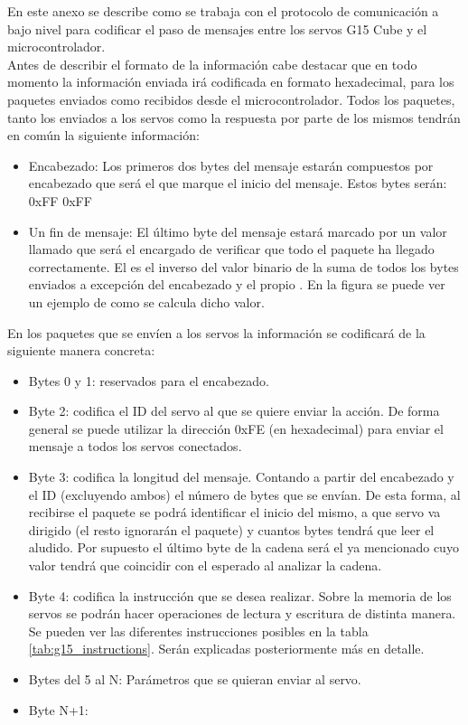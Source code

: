     En este anexo se describe como se trabaja con el protocolo de comunicación a bajo nivel para codificar el paso de mensajes entre los servos G15 Cube y el microcontrolador. 
    \\
    
    Antes de describir el formato de la información cabe destacar que en todo momento la información enviada irá codificada en formato hexadecimal, para los paquetes enviados como recibidos desde el microcontrolador. Todos los paquetes, tanto los enviados a los servos como la respuesta por parte de los mismos tendrán en común la siguiente información:
    
    \begin{itemize}
    	\item Encabezado: Los primeros dos bytes del mensaje estarán compuestos por encabezado que será el que marque el inicio del mensaje. Estos bytes serán: 0xFF 0xFF
    	\item Un fin de mensaje: El último byte del mensaje estará marcado por un valor llamado  que será el encargado de verificar que todo el paquete ha llegado correctamente. El  es el inverso del valor binario de la suma de todos los bytes enviados a excepción del encabezado y el propio . En la figura \completar se puede ver un ejemplo de como se calcula dicho valor.
    \end{itemize}
    
    
    En los paquetes que se envíen a los servos la información se codificará de la siguiente manera concreta:
    
    \begin{itemize}
    	\item Bytes 0 y 1: reservados para el encabezado.
    	\item Byte 2: codifica el ID del servo al que se quiere enviar la acción. De forma general se puede utilizar la dirección 0xFE (en hexadecimal) para enviar el mensaje a todos los servos conectados.
    	\item Byte 3: codifica la longitud del mensaje. Contando a partir del encabezado y el ID (excluyendo ambos) el número de bytes que se envían. De esta forma, al recibirse el paquete se podrá identificar el inicio del mismo, a que servo va dirigido (el resto ignorarán el paquete) y cuantos bytes tendrá que leer el aludido. Por supuesto el último byte de la cadena será el ya mencionado  cuyo valor tendrá que coincidir con el esperado al analizar la cadena.
    	\item Byte 4: codifica la instrucción que se desea realizar. Sobre la memoria de los servos se podrán hacer operaciones de lectura y escritura de distinta manera. Se pueden ver las diferentes instrucciones posibles en la tabla \ref{tab:g15_instructions}. Serán explicadas posteriormente más en detalle.
    	\item Bytes del 5 al N: Parámetros que se quieran enviar al servo.
    	\item Byte N+1: 
    \end{itemize}
    
